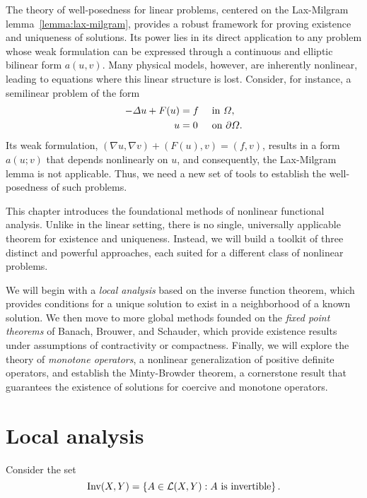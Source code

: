 The theory of well-posedness for linear problems, centered on the Lax-Milgram lemma~\ref{lemma:lax-milgram}, provides a robust framework for proving existence and uniqueness of solutions. Its power lies in its direct application to any problem whose weak formulation can be expressed through a continuous and elliptic bilinear form $a(u,v)$. Many physical models, however, are inherently nonlinear, leading to equations where this linear structure is lost. Consider, for instance, a semilinear problem of the form
\begin{equation}\label{eq:semilinear-example}
    \begin{aligned}
        -\Delta u + F(u) &= f &&\text{ in } \Omega,  \\
        u &= 0 && \text{ on } \partial\Omega.
    \end{aligned}
\end{equation}
Its weak formulation, $(\nabla u, \nabla v) + (F(u),v) = (f,v)$, results in a form $a(u;v)$ that depends nonlinearly on $u$, and consequently, the Lax-Milgram lemma is not applicable. Thus, we need a new set of tools to establish the well-posedness of such problems.

This chapter introduces the foundational methods of nonlinear functional analysis. Unlike in the linear setting, there is no single, universally applicable theorem for existence and uniqueness. Instead, we will build a toolkit of three distinct and powerful approaches, each suited for a different class of nonlinear problems.

We will begin with a \emph{local analysis} based on the inverse function theorem, which provides conditions for a unique solution to exist in a neighborhood of a known solution. We then move to more global methods founded on the \emph{fixed point theorems} of Banach, Brouwer, and Schauder, which provide existence results under assumptions of contractivity or compactness. Finally, we will explore the theory of \emph{monotone operators}, a nonlinear generalization of positive definite operators, and establish the Minty-Browder theorem, a cornerstone result that guarantees the existence of solutions for coercive and monotone operators.

\section{Local analysis}\label{sec:local-analysis}
Consider the set
\[ \operatorname{\text{Inv}}(X,Y) = \left\{ A\in \mathcal{L}(X,Y): A \text{ is invertible} \right\}. \]


